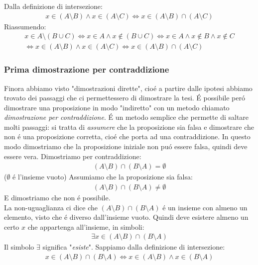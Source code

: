 \documentclass[twoside]{article} %
\begin{document}
	Dalla definizione di intersezione:
	\begin{gather*}
		x\in (A\setminus B) \wedge x\in (A\setminus C)\Leftrightarrow x\in (A\setminus B)\cap (A\setminus C)
	\end{gather*}
	Riassumendo:
	\begin{gather*}
		x\in A\setminus(B\cup C) \Leftrightarrow x\in A \wedge x\notin (B\cup C)\Leftrightarrow x\in A \wedge x\notin B\wedge x\notin C\\ \Leftrightarrow x\in (A\setminus B) \wedge x\in (A\setminus C)\Leftrightarrow x\in (A\setminus B)\cap (A\setminus C)
	\end{gather*}
	\newpage
	
	\subsubsection{Prima dimostrazione per contraddizione}
	Finora abbiamo visto "dimostrazioni dirette", cio\'e a partire dalle ipotesi abbiamo trovato dei passaggi che ci permettessero di dimostrare la tesi. \'E possibile per\'o dimostrare una proposizione in modo "indiretto" con un metodo chiamato \textit{dimostrazione per contraddizione}. \'E un metodo semplice che permette di saltare molti passaggi: si tratta di \textit{assumere} che la proposizione sia falsa e dimostrare che non \'e una proposizione corretta, cio\'e che porta ad una contraddizione. In questo modo dimostriamo che la proposizione iniziale non pu\'o essere falsa, quindi deve essere vera. Dimostriamo per contraddizione:
	\begin{gather*}
		(A\setminus B)\cap (B\setminus A)=\emptyset
	\end{gather*}
	($\emptyset$ \'e l'insieme vuoto) 
	Assumiamo che la proposizione sia falsa:
	\begin{gather*}
		(A\setminus B)\cap (B\setminus A)\neq\emptyset
	\end{gather*}
	E dimostriamo che non \'e possibile.\\
	La non-uguaglianza ci dice che $(A\setminus B)\cap (B\setminus A)$ \'e un insieme con almeno un elemento, visto che \'e diverso dall'insieme vuoto. Quindi deve esistere almeno un certo $x$ che appartenga all'insieme, in simboli:
	\begin{gather*}
		\exists x\in(A\setminus B)\cap (B\setminus A)
	\end{gather*}
	Il simbolo $\exists$ significa "\textit{esiste}". Sappiamo dalla definizione di intersezione:
	\begin{gather*}
		x\in(A\setminus B)\cap (B\setminus A)\Leftrightarrow x\in (A\setminus B) \wedge x\in (B\setminus A)
	\end{gather*}	
\end{document}
